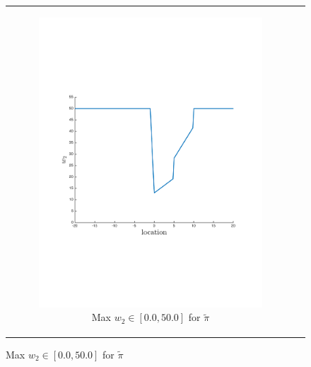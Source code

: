 {\centering
    \begin{figure}[ht]
        \begin{tabular}{cc}
            \begin{subfigure}{0.2\textwidth}\centering\includegraphics[width=\textwidth]{images/robot_opt_new}\caption{Max {\footnotesize $w_2 \in \left[0.0, 50.0 \right]$} for $ \tilde{\pi} $}\label{fig:navigation_opt}\end{subfigure}&            

\end{tabular}
\end{figure}}
